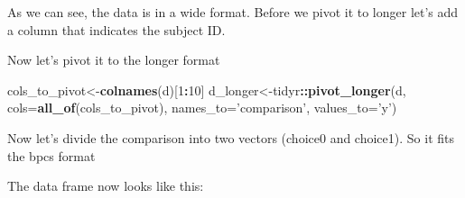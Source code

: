 \documentclass[
]{book}
\newenvironment{Shaded}{\begin{snugshade}}{\end{snugshade}}
\newcommand{\DataTypeTok}[1]{\textcolor[rgb]{0.13,0.29,0.53}{#1}}
\newcommand{\DecValTok}[1]{\textcolor[rgb]{0.00,0.00,0.81}{#1}}
\newcommand{\KeywordTok}[1]{\textcolor[rgb]{0.13,0.29,0.53}{\textbf{#1}}}
\newcommand{\NormalTok}[1]{#1}
\newcommand{\OperatorTok}[1]{\textcolor[rgb]{0.81,0.36,0.00}{\textbf{#1}}}
\newcommand{\StringTok}[1]{\textcolor[rgb]{0.31,0.60,0.02}{#1}}
\begin{document}
As we can see, the data is in a wide format. Before we pivot it to longer let's add a column that indicates the subject ID.

\begin{Shaded}
\end{Shaded}

Now let's pivot it to the longer format

\begin{Shaded}
\begin{Highlighting}[]
\NormalTok{cols_to_pivot<-}\KeywordTok{colnames}\NormalTok{(d)[}\DecValTok{1}\OperatorTok{:}\DecValTok{10}\NormalTok{]}
\NormalTok{d_longer<-tidyr}\OperatorTok{::}\KeywordTok{pivot_longer}\NormalTok{(d, }\DataTypeTok{cols=}\KeywordTok{all_of}\NormalTok{(cols_to_pivot), }\DataTypeTok{names_to=}\StringTok{'comparison'}\NormalTok{, }\DataTypeTok{values_to=}\StringTok{'y'}\NormalTok{)}
\end{Highlighting}
\end{Shaded}

Now let's divide the comparison into two vectors (choice0 and choice1). So it fits the bpcs format

\begin{Shaded}
\end{Shaded}

The data frame now looks like this:

\begin{Shaded}
\end{Shaded}
\end{document}
